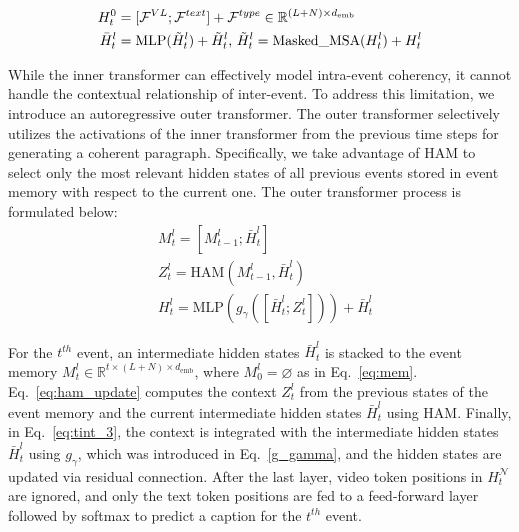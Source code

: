 \documentclass[letterpaper]{article} \usepackage{aaai23}  \usepackage{times}  \usepackage{helvet}  \usepackage{courier}  \usepackage[hyphens]{url}  \usepackage{graphicx} \urlstyle{rm} \def\UrlFont{\rm}  \usepackage{natbib}  \usepackage{caption} \frenchspacing  \setlength{\pdfpagewidth}{8.5in}  \setlength{\pdfpageheight}{11in}  \usepackage{algorithm}
\begin{document}
\begin{subequations}
\begin{align}
    H_t^0 &= [\mathcal{F}^{VL}; \mathcal{F}^{text}] +  \mathcal{F}^{type} \in \mathbb{R}^{(L+N) \times d_{\text{emb}}}\\
    \bar{H}_t^l &= \text{MLP}(\Tilde{H}_t^l) + \Tilde{H}_t^l \text{, } \Tilde{H}_t^l= \text{Masked\_MSA}(H_t^l)+H_t^l \label{eq:inter1}
\end{align}
\end{subequations}



While the inner transformer can effectively model intra-event coherency, it cannot handle the contextual relationship of inter-event. To address this limitation, we introduce an autoregressive outer transformer. The outer transformer selectively utilizes the activations of the inner transformer from the previous time steps for generating a coherent paragraph.  
Specifically, we take advantage of HAM to select only the most relevant hidden states of all previous events stored in event memory with respect to the current one.
The outer transformer process is formulated below:
\vspace{-1mm}
\begin{subequations}
\begin{align}
&M_t^l = [M_{t-1}^l; \bar{H}_t^l ]\label{eq:mem}\\
    &Z_t^l = \text{HAM}(M_{t-1}^l, \bar{H}_t^l)\label{eq:ham_update}\\
    &H_t^l = \text{MLP}(g_\gamma([\bar{H}_t^l; Z_t^l])) + \bar{H}_t^l
    \label{eq:tint_3}
\end{align}
\end{subequations}
 
For the $t^{th}$ event, an intermediate hidden states $\bar{H}_t^l$ is stacked to the event memory $M_{t}^l \in \mathbb{R}^{t \times(L+N) \times d_{\text{emb}}}$, where $M_0^l = \varnothing$ as in Eq.~\ref{eq:mem}.  Eq.~\ref{eq:ham_update} computes the context $Z_t^l$ from the previous states of the event memory and the current intermediate hidden states $\bar{H}_t^l$ using HAM. Finally, in Eq.~\ref{eq:tint_3}, the context is integrated with the intermediate hidden states $\bar{H}_t^l$ using $g_\gamma$, which was introduced in Eq.~\ref{g_gamma}, and the hidden states are updated via residual connection. 
After the last layer, video token positions in $H_t^{\mathcal{N}}$ are ignored, and only the text token positions are fed to a feed-forward layer followed by softmax to predict a caption for the $t^{th}$ event. 
\end{document}
